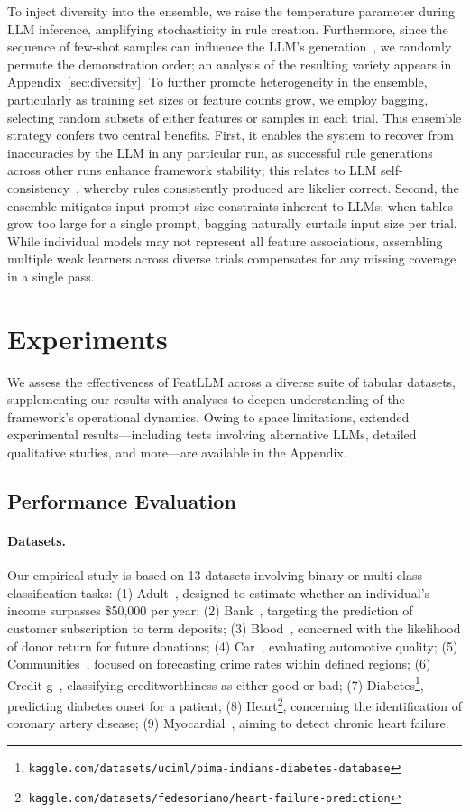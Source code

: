 To inject diversity into the ensemble, we raise the temperature parameter during LLM inference, amplifying stochasticity in rule creation. Furthermore, since the sequence of few-shot samples can influence the LLM’s generation~\cite{lu2022fantastically}, we randomly permute the demonstration order; an analysis of the resulting variety appears in Appendix~\ref{sec:diversity}. To further promote heterogeneity in the ensemble, particularly as training set sizes or feature counts grow, we employ bagging, selecting random subsets of either features or samples in each trial. This ensemble strategy confers two central benefits. First, it enables the system to recover from inaccuracies by the LLM in any particular run, as successful rule generations across other runs enhance framework stability; this relates to LLM self-consistency~\cite{wang2022self}, whereby rules consistently produced are likelier correct. Second, the ensemble mitigates input prompt size constraints inherent to LLMs: when tables grow too large for a single prompt, bagging naturally curtails input size per trial. While individual models may not represent all feature associations, assembling multiple weak learners across diverse trials compensates for any missing coverage in a single pass.

\section{Experiments}
We assess the effectiveness of \textsf{FeatLLM} across a diverse suite of tabular datasets, supplementing our results with analyses to deepen understanding of the framework's operational dynamics. Owing to space limitations, extended experimental results—including tests involving alternative LLMs, detailed qualitative studies, and more—are available in the Appendix. 

\subsection{Performance Evaluation}
\paragraph{Datasets.}
Our empirical study is based on 13 datasets involving binary or multi-class classification tasks: (1) Adult~\cite{asuncion2007uci}, designed to estimate whether an individual’s income surpasses \$50,000 per year; (2) Bank~\cite{moro2014data}, targeting the prediction of customer subscription to term deposits; (3) Blood~\cite{yeh2009knowledge}, concerned with the likelihood of donor return for future donations; (4) Car~\cite{kadra2021well}, evaluating automotive quality; (5) Communities~\cite{misc_communities_and_crime_183}, focused on forecasting crime rates within defined regions; (6) Credit-g~\cite{kadra2021well}, classifying creditworthiness as either good or bad; (7) Diabetes\footnote{\texttt{kaggle.com/datasets/uciml/pima-indians-diabetes-database}}, predicting diabetes onset for a patient; (8) Heart\footnote{\texttt{kaggle.com/datasets/fedesoriano/heart-failure-prediction}}, concerning the identification of coronary artery disease; (9) Myocardial~\cite{misc_myocardial_infarction_complications_579}, aiming to detect chronic heart failure. 


